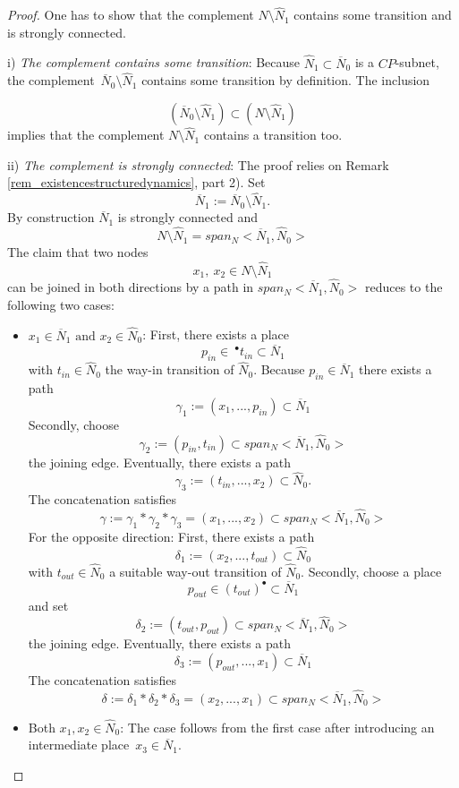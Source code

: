 \documentclass{fundam}
\newcommand{\qed}{}
\begin{document}
\begin{proof}
One has to show that the complement $N \setminus \hat{N}_1$ contains some transition and is strongly connected.
\begin{flushleft}
i) \emph{The complement contains some transition}: Because $\hat{N}_1 \subset \overline{N}_0$ is a $CP$-subnet, the \mbox{complement $\overline{N}_0 \setminus \hat{N}_1$}
contains some transition by definition. The inclusion
\end{flushleft}
$$(\overline{N}_0 \setminus \hat{N}_1) \subset (N \setminus \hat{N}_1)$$
implies that the complement $N \setminus \hat{N}_1$ contains a transition too.
\begin{flushleft}
ii) \emph{The complement is strongly connected}: The proof relies on Remark \ref{rem_existencestructuredynamics}, part 2). Set
$$\overline{N}_1:=\overline{N}_0\setminus \hat{N}_1.$$
By construction $\overline{N}_1$ is strongly connected and
$$N \setminus \hat{N}_1= span_N<\overline{N}_1,\hat{N}_0>$$
The claim that two nodes
$$x_1,\ x_2 \in N \setminus \hat{N}_1$$
can be joined in both directions by a path in $span_N<\overline{N}_1,\hat{N}_0>$ reduces to the following two cases:
\begin{itemize}
\item $x_1 \in \overline{N}_1 \text{ and } x_2 \in \hat{N}_0$: First, there exists a place
$$p_{in} \in\ ^\bullet t_{in} \subset \overline{N}_1$$
with $t_{in} \in\hat{N}_0$ the way-in transition of $\hat{N}_0$. Because
$p_{in} \in \overline{N}_1$ there exists a path
$$\gamma_1:=(x_1,...,p_{in}) \subset \overline{N}_1$$
Secondly, choose
$$\gamma_2:=(p_{in},t_{in}) \subset span_N<\overline{N}_1,\hat{N}_0>$$
the joining edge. Eventually, there exists a path
$$\gamma_3:=(t_{in},...,x_2) \subset \hat{N}_0.$$
The concatenation satisfies
$$\gamma:=\gamma_1 *\gamma_2 *\gamma_3=(x_1,...,x_2) \subset span_N<\overline{N}_1,\hat{N}_0>$$
For the opposite direction: First, there exists a path
$$\delta_1:=(x_2,...,t_{out}) \subset \hat{N}_0$$
with $t_{out} \in \hat{N}_0$ a suitable way-out transition of $\hat{N}_0$. Secondly, choose a place
$$p_{out} \in (t_{out})^\bullet \subset \overline{N}_1$$
and set
$$\delta_2:=(t_{out},p_{out})  \subset span_N<\overline{N}_1,\hat{N}_0>$$
the joining edge. Eventually, there exists a path
$$\delta_3:=(p_{out},...,x_1) \subset \overline{N}_1$$
The concatenation satisfies
$$\delta:=\delta_1*\delta_2*\delta_3=(x_2,...,x_1) \subset span_N<\overline{N}_1,\hat{N}_0>$$
\item Both $x_1, x_2 \in \hat{N}_0$: The case follows from the first case after introducing an intermediate \mbox{place $x_3 \in \overline{N}_1$}.\qed
\end{itemize}
\end{flushleft}

\vspace*{-5mm}
\end{proof}
\end{document}
